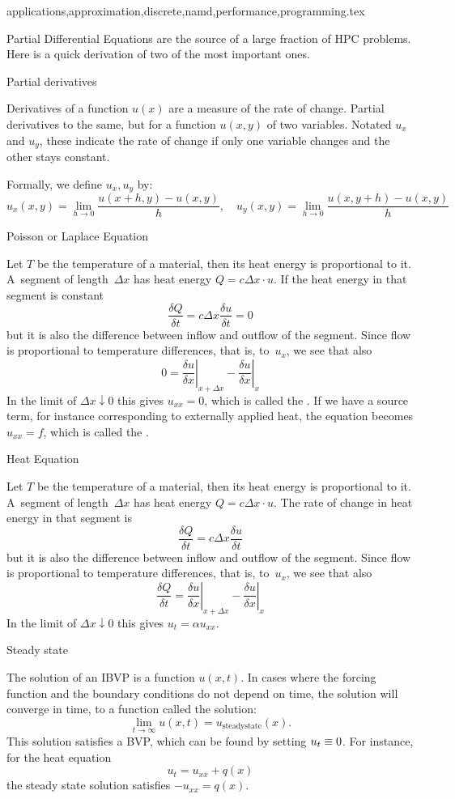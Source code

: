 {applications,approximation,discrete,namd,performance,programming}.tex%

Partial Differential Equations
are the source of a large fraction of \ac{HPC} problems. Here is a
quick derivation of two of the most important ones.

 {Partial derivatives}

Derivatives of a function $u(x)$ are a measure of the rate of
change. Partial derivatives to the same, but for a function $u(x,y)$
of two variables. Notated $u_x$ and $u_y$, these  indicate the rate of change if only one variable changes
and the other stays constant.

Formally, we define
$u_x,u_y$ by:
\[ u_x(x,y) = \lim_{h\rightarrow0}\frac{u(x+h,y)-u(x,y)}h,\quad
   u_y(x,y) = \lim_{h\rightarrow0}\frac{u(x,y+h)-u(x,y)}h
\]

 {Poisson or Laplace Equation}

Let $T$ be the temperature of a material, then its heat energy is
proportional to it. A~segment of length~$\Delta x$ has heat energy
$Q=c\Delta x\cdot u$. If the heat energy in that
segment is constant
\[ \frac{\delta Q}{\delta t}=c\Delta x\frac{\delta u}{\delta t}=0 \]
but it is also the difference between inflow and outflow of the
segment. Since flow is proportional to temperature differences, that
is, to~$u_x$, we see that also
\[ 0=
    \left.\frac{\delta u}{\delta x}\right|_{x+\Delta x}-
    \left.\frac{\delta u}{\delta x}\right|_{x}
\]
In the limit of $\Delta x\downarrow0$ this gives $u_{xx}=0$, which is
called the . If we have a source term, for
instance corresponding to externally applied heat, the equation
becomes $u_{xx}=f$, which is called the .

 {Heat Equation}

Let $T$ be the temperature of a material, then its heat energy is
proportional to it. A~segment of length~$\Delta x$ has heat energy
$Q=c\Delta x\cdot u$. The rate of change in heat energy in that
segment is
\[ \frac{\delta Q}{\delta t}=c\Delta x\frac{\delta u}{\delta t} \]
but it is also the difference between inflow and outflow of the
segment. Since flow is proportional to temperature differences, that
is, to~$u_x$, we see that also
\[ \frac{\delta Q}{\delta t}=
    \left.\frac{\delta u}{\delta x}\right|_{x+\Delta x}-
    \left.\frac{\delta u}{\delta x}\right|_{x}
\]
In the limit of $\Delta x\downarrow0$ this gives $u_t=\alpha u_{xx}$.

 {Steady state}
\label{app:steadystate}

The solution of an \ac{IBVP} is a function $u(x,t)$. In cases where
the forcing function and the boundary conditions do not depend on
time, the solution will converge in time, to a function called the
 solution:
\[ \lim_{t\rightarrow\infty} u(x,t)=u_{\mathrm{steady state}}(x). \]
This solution satisfies a \ac{BVP}, which can be found by setting
$u_t\equiv\nobreak0$. For instance, for the heat equation \[
u_t=u_{xx}+q(x) \] the steady state solution satisfies $-u_{xx}=q(x)$.


